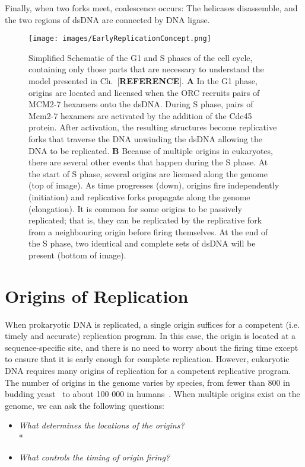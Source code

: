 		Finally, when two forks meet, coalescence occurs:
		The helicases disassemble, and the two regions of dsDNA are connected by DNA ligase.~\cite{MolecularCellBiology}
	
	\begin{figure}[tbh]
		\begin{center}
			\texttt{[image: images/EarlyReplicationConcept.png]}
		\end{center}
			\caption[Events During Replication]{\label{fig:EarlyReplicationConcept} Simplified Schematic of the G1 and S phases of the cell cycle, containing only those parts that are necessary to understand the model presented in Ch.~[\textbf{REFERENCE}].
				\textbf{A} In the G1 phase, origins are located and licensed when the ORC recruits pairs of MCM2-7 hexamers onto the dsDNA.
					During S phase, pairs of Mcm2-7 hexamers are activated by the addition of the Cdc45 protein.
					After activation, the resulting structures become replicative forks that traverse the DNA unwinding the dsDNA allowing the DNA to be replicated.
				\textbf{B} Because of multiple origins in eukaryotes, there are several other events that happen during the S phase.
					At the start of S phase, several origins are licensed along the genome (top of image).
					As time progresses (down), origins fire independently (initiation) and replicative forks propagate along the genome (elongation).
					It is common for some origins to be passively replicated; that is, they can be replicated by the replicative fork from a neighbouring origin before firing themselves.
					At the end of the S phase, two identical and complete sets of dsDNA will be present (bottom of image).}
	\end{figure}
	
	
	\section{Origins of Replication}
	\label{sec:Origins}
	
	When prokaryotic DNA is replicated, a single origin suffices for a competent (i.e. timely and accurate) replication program.
	In this case, the origin is located at a sequence-specific site, and there is no need to worry about the firing time except to ensure that it is early enough for complete replication.
	However, eukaryotic DNA requires many origins of replication for a competent replicative program.
	The number of origins in the genome varies by species, from fewer than 800 in budding yeast~\cite{OriDB} to about 100 000 in humans~\cite{OriginsReview}.
	When multiple origins exist on the genome, we can ask the following questions:
	\begin{itemize}
		\item \emph{What determines the locations of the origins?}\\*
		\item \emph{What controls the timing of origin firing?}
	\end{itemize}
	
